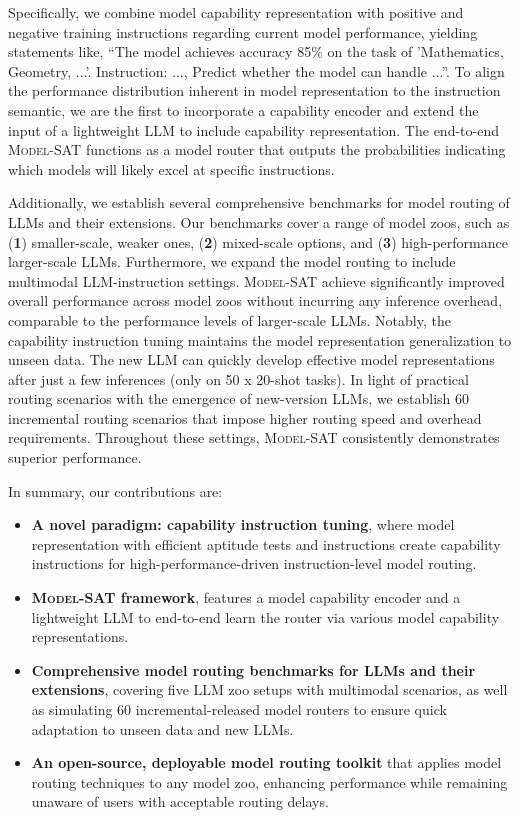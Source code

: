 Specifically, we combine model capability representation with positive and negative training instructions regarding current model performance, yielding statements like, ``The model achieves accuracy 85\% on the task of 'Mathematics, Geometry, ...'. Instruction: ..., Predict whether the model can handle ...''.
To align the performance distribution inherent in model representation to the instruction semantic, we are the first to incorporate a capability encoder and extend the input of a lightweight LLM to include capability representation. The end-to-end \textsc{Model-SAT} functions as a model router that outputs the probabilities indicating which models will likely excel at specific instructions.

Additionally, we establish several comprehensive benchmarks for model routing of LLMs and their extensions. Our benchmarks cover a range of model zoos, such as (\textbf{1}) smaller-scale, weaker ones, (\textbf{2}) mixed-scale options, and (\textbf{3}) high-performance larger-scale LLMs. Furthermore, we expand the model routing to include multimodal LLM-instruction settings.
\textsc{Model-SAT} achieve significantly improved overall performance across model zoos without incurring any inference overhead, comparable to the performance levels of larger-scale LLMs.
Notably, the capability instruction tuning maintains the model representation generalization to unseen data. The new LLM can quickly develop effective model representations after just a few inferences (only on 50 x 20-shot tasks). In light of practical routing scenarios with the emergence of new-version LLMs, we establish 60 incremental routing scenarios that impose higher routing speed and overhead requirements. Throughout these settings, \textsc{Model-SAT} consistently demonstrates superior performance.

In summary, our contributions are:
\begin{itemize}[noitemsep,topsep=0pt,leftmargin=*]
\item \textbf{A novel paradigm: capability instruction tuning}, where model representation with efficient aptitude tests and instructions create capability instructions for high-performance-driven instruction-level model routing.
\item \textbf{\textsc{Model-SAT} framework}, features a model capability encoder and a lightweight LLM to end-to-end learn the router via various model capability representations.
\item \textbf{Comprehensive model routing benchmarks for LLMs and their extensions}, covering five LLM zoo setups with multimodal scenarios, as well as simulating 60 incremental-released model routers to ensure quick adaptation to unseen data and new LLMs.
\item \textbf{An open-source, deployable model routing toolkit} that applies model routing techniques to any model zoo, enhancing performance while remaining unaware of users with acceptable routing delays.
\end{itemize}
